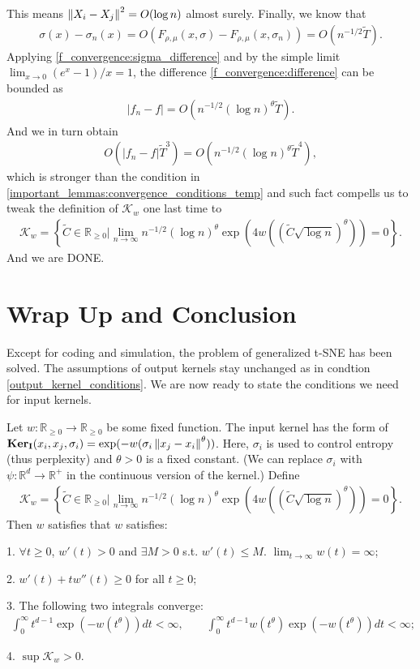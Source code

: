 \documentclass[10pt]{article}
\newcommand{\ki}{\mathbf{Ker}_{\mathbf{I}}}
\begin{document}
This means $\left\lVert X_i-X_j\right\rVert^2 = O(\log n)$ almost surely. Finally, we know that
\begin{align} \label{f_convergence:sigma_difference}
  \sigma(x)-\sigma_n(x) = O(F_{\rho,\mu}(x,\sigma)-F_{\rho,\mu}(x,\sigma_n)) = O(n^{-1/2}\tilde{T}).
\end{align}
Applying \eqref{f_convergence:sigma_difference} and by the simple limit $\lim_{x \to 0}(e^x-1)/x = 1$, the difference \eqref{f_convergence:difference} can be bounded as
\begin{align}
  |f_n-f| = O(n^{-1/2} (\log n)^{\theta}\tilde{T}).
\end{align}
And we in turn obtain
\begin{align}
  O(|f_n-f|\tilde{T}^3) = O(n^{-1/2} (\log n)^{\theta}\tilde{T}^4),
\end{align}
which is stronger than the condition in \ref{important_lemmas:convergence_conditions_temp} and such fact compells us to tweak the definition of $\mathcal{K}_w$ one last time to
\begin{align}
  \mathcal{K}_w = \left\{\tilde{C} \in \mathbb{R}_{\geq 0} \bigg\rvert \lim_{n \to \infty} n^{-1/2} (\log n)^{\theta} \exp \left(4 w\left(\left(\tilde{C} \sqrt{\log n} \right)^{\theta} \right) \right) = 0 \right\}.
\end{align}
And we are DONE.
\section{Wrap Up and Conclusion}
Except for coding and simulation, the problem of generalized t-SNE has been
solved. The assumptions of output kernels stay unchanged as in condtion
\ref{output_kernel_conditions}. We are now ready to state the conditions we
need for input kernels.
\begin{condition} \label{input_kernel_conditions_2}
  Let $w: \mathbb{R}_{\geq 0} \to \mathbb{R}_{\geq 0}$ be some fixed function. The input kernel has the form of $\ki(x_i,x_j,\sigma_i) = \exp(-w(\sigma_i\norm{x_j-x_i}^{\theta}))$. Here, $\sigma_i$ is used to control entropy (thus perplexity) and $\theta>0$ is a fixed constant. (We can replace $\sigma_i$ with $\psi: \mathbb{R}^d \to \mathbb{R}^+$ in the continuous version of the kernel.) Define
  \begin{align}
    \mathcal{K}_w = \left\{\tilde{C} \in \mathbb{R}_{\geq 0} \bigg\rvert \lim_{n \to \infty} n^{-1/2} (\log n)^{\theta} \exp \left(4 w\left(\left(\tilde{C} \sqrt{\log n} \right)^{\theta} \right) \right) = 0 \right\}.
  \end{align}
  Then $w$ satisfies that
  $w$ satisfies:

  1. $\forall t \geq 0$, $w'(t)>0$ and $\exists M > 0$ s.t. $w'(t) \leq M$. $\lim_{t \to \infty} w(t) = \infty$;

  2. $w'(t)+tw''(t) \geq 0$ for all $t \geq 0$;

  3. The following two integrals converge:
  \begin{align}
    \int_0^{\infty} t^{d-1}\exp(-w(t^{\theta}))dt < \infty, \qquad \int_0^{\infty} t^{d-1} w(t^{\theta}) \exp(-w(t^{\theta}))dt < \infty;
  \end{align}

  4. $\sup \mathcal{K}_w > 0$.
\end{condition}
\end{document}
